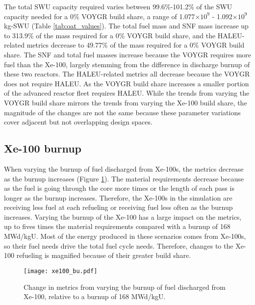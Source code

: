 The total \gls{SWU} capacity required varies between 99.6\%-101.2\% of the 
\gls{SWU} capacity needed for a 0\% VOYGR build share, a range of 1.077$\times 10^9$
- 1.092$\times 10^9$ kg-SWU (Table \ref{tab:oat_values}). The total fuel mass 
and \gls{SNF} mass increase 
up to 313.9\% of the mass required for a 0\% VOYGR build share, and the 
\gls{HALEU}-related metrics decrease to 49.77\% of the mass required 
for a 0\% VOYGR build share. The \gls{SNF} and total fuel masses increase 
because the VOYGR requires more fuel than the Xe-100, largely stemming from 
the difference in discharge burnup of these two reactors. The \gls{HALEU}-related 
metrics all decrease because the VOYGR does not require \gls{HALEU}. As the 
VOYGR build share increases a smaller portion of the advanced reactor fleet 
requires \gls{HALEU}. While the trends from varying the VOYGR build share 
mirrors the trends from varying the Xe-100 build share, the magnitude of the 
changes are not the same because these 
parameter variations cover adjacent but not overlapping design spaces. 

\subsection{Xe-100 burnup}
When varying the burnup of fuel discharged from Xe-100s, the metrics decrease 
as the burnup increases (Figure \ref{fig:xe100_bu_s7}). The material 
requirements decrease because as 
the fuel is going through the core more times or the 
length of each pass is longer as the burnup increases. 
Therefore, the Xe-100s in the simulation are receiving 
less fuel at each refueling or receiving fuel less often as the burnup increases. 
Varying the burnup of the Xe-100 has a large impact on the metrics, up to fives times 
the material requirements compared with a burnup of 168 MWd/kgU. Most of 
the energy produced in these scenarios comes from Xe-100s, so their fuel needs 
drive the total fuel cycle needs. Therefore, changes to the Xe-100 refueling is 
magnified because of their greater build share. 

\begin{figure}[ht]
    \centering
    \texttt{[image: xe100\_bu.pdf]}
    \caption{Change in metrics from varying the burnup of fuel 
    discharged from Xe-100, relative to a burnup of 168 MWd/kgU.}
    \label{fig:xe100_bu_s7}
\end{figure}

